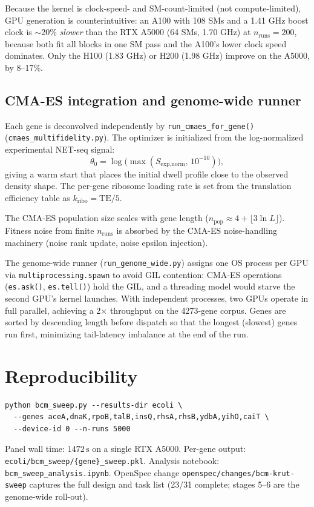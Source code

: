 \documentclass[11pt]{article}
\begin{document}
Because the kernel is clock-speed- and SM-count-limited (not compute-limited),
GPU generation is counterintuitive: an A100 with 108 SMs and a 1.41 GHz boost
clock is $\sim$20\% \emph{slower} than the RTX A5000 (64 SMs, 1.70 GHz) at
$n_{\text{runs}} = 200$, because both fit all blocks in one SM pass and the
A100's lower clock speed dominates. Only the H100 (1.83 GHz) or H200 (1.98
GHz) improve on the A5000, by 8--17\%.

\subsection{CMA-ES integration and genome-wide runner}

Each gene is deconvolved independently by \texttt{run\_cmaes\_for\_gene()}
(\texttt{cmaes\_multifidelity.py}). The optimizer is initialized from the
log-normalized experimental NET-seq signal:
\begin{equation}
  \theta_0 = \log\bigl(\max(S_{\text{exp,norm}},\, 10^{-10})\bigr),
\end{equation}
giving a warm start that places the initial dwell profile close to the
observed density shape. The per-gene ribosome loading rate is set from the
translation efficiency table as $k_{\text{ribo}} = \text{TE}/5$.

The CMA-ES population size scales with gene length ($n_{\text{pop}} \approx
4 + \lfloor 3 \ln L \rfloor$). Fitness noise from finite $n_{\text{runs}}$
is absorbed by the CMA-ES noise-handling machinery (noise rank update, noise
epsilon injection).

The genome-wide runner (\texttt{run\_genome\_wide.py}) assigns one OS process
per GPU via \texttt{multiprocessing.spawn} to avoid GIL contention: CMA-ES
operations (\texttt{es.ask()}, \texttt{es.tell()}) hold the GIL, and a
threading model would starve the second GPU's kernel launches. With independent
processes, two GPUs operate in full parallel, achieving a 2$\times$ throughput
on the 4273-gene corpus. Genes are sorted by descending length before dispatch
so that the longest (slowest) genes run first, minimizing tail-latency imbalance
at the end of the run.

\section{Reproducibility}

\begin{lstlisting}[basicstyle=\ttfamily\small, breaklines=true]
python bcm_sweep.py --results-dir ecoli \
  --genes aceA,dnaK,rpoB,talB,insQ,rhsA,rhsB,ydbA,yihO,caiT \
  --device-id 0 --n-runs 5000
\end{lstlisting}

Panel wall time: $1472\,\text{s}$ on a single RTX A5000. Per-gene
output: \texttt{ecoli/bcm\_sweep/\{gene\}\_sweep.pkl}. Analysis
notebook: \texttt{bcm\_sweep\_analysis.ipynb}. OpenSpec change
\texttt{openspec/changes/bcm-krut-sweep} captures the full design and
task list (23/31 complete; stages 5--6 are the genome-wide roll-out).
\end{document}
